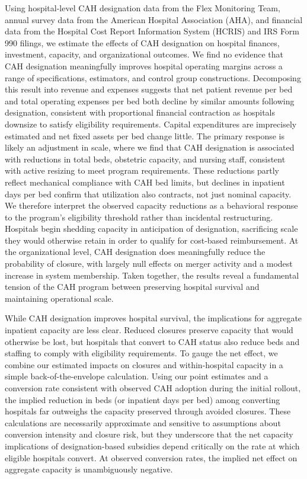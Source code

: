 \documentclass[a4paper, 12pt, twoside]{article}
\begin{document}
Using hospital-level CAH designation data from the Flex Monitoring Team, annual survey data from the American Hospital Association (AHA), and financial data from the Hospital Cost Report Information System (HCRIS) and IRS Form 990 filings, we estimate the effects of CAH designation on hospital finances, investment, capacity, and organizational outcomes. We find no evidence that CAH designation meaningfully improves hospital operating margins across a range of specifications, estimators, and control group constructions. Decomposing this result into revenue and expenses suggests that net patient revenue per bed and total operating expenses per bed both decline by similar amounts following designation, consistent with proportional financial contraction as hospitals downsize to satisfy eligibility requirements. Capital expenditures are imprecisely estimated and net fixed assets per bed change little. The primary response is likely an adjustment in scale, where we find that CAH designation is associated with reductions in total beds, obstetric capacity, and nursing staff, consistent with active resizing to meet program requirements. These reductions partly reflect mechanical compliance with CAH bed limits, but declines in inpatient days per bed confirm that utilization also contracts, not just nominal capacity. We therefore interpret the observed capacity reductions as a behavioral response to the program's eligibility threshold rather than incidental restructuring. Hospitals begin shedding capacity in anticipation of designation, sacrificing scale they would otherwise retain in order to qualify for cost-based reimbursement. At the organizational level, CAH designation does meaningfully reduce the probability of closure, with largely null effects on merger activity and a modest increase in system membership. Taken together, the results reveal a fundamental tension of the CAH program between preserving hospital survival and maintaining operational scale.

While CAH designation improves hospital survival, the implications for aggregate inpatient capacity are less clear. Reduced closures preserve capacity that would otherwise be lost, but hospitals that convert to CAH status also reduce beds and staffing to comply with eligibility requirements. To gauge the net effect, we combine our estimated impacts on closures and within-hospital capacity in a simple back-of-the-envelope calculation. Using our point estimates and a conversion rate consistent with observed CAH adoption during the initial rollout, the implied reduction in beds (or inpatient days per bed) among converting hospitals far outweighs the capacity preserved through avoided closures. These calculations are necessarily approximate and sensitive to assumptions about conversion intensity and closure risk, but they underscore that the net capacity implications of designation-based subsidies depend critically on the rate at which eligible hospitals convert. At observed conversion rates, the implied net effect on aggregate capacity is unambiguously negative. 
\end{document}
